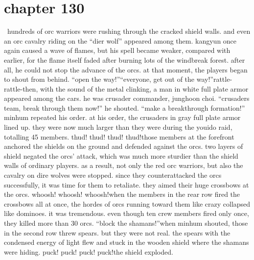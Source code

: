 \section{chapter 130}






 hundreds of orc warriors were rushing through the cracked shield walls.
 and even an orc cavalry riding on the “dier wolf” appeared among them.
kangyun once again caused a wave of flames, but his spell became weaker, compared with earlier, for the flame itself faded after burning lots of the windbreak forest.
after all, he could not stop the advance of the orcs.
at that moment, the players began to shout from behind.
“open the way!”“everyone, get out of the way!”rattle- rattle-then, with the sound of the metal clinking, a man in white full plate armor appeared among the cars.
he was crusader commander, junghoon choi.
“crusaders team, break through them now!” he shouted.
“make a breakthrough formation!” minhum repeated his order.
at his order, the crusaders in gray full plate armor lined up.
 they were now much larger than they were during the youido raid, totalling 45 members.
thud! thud! thud! thud!those members at the forefront anchored the shields on the ground and defended against the orcs.
 two layers of shield negated the orcs’ attack, which was much more sturdier than the shield walls of ordinary players.
as a result, not only the red orc warriors, but also the cavalry on dire wolves were stopped.
 since they counterattacked the orcs successfully, it was time for them to retaliate.
 they aimed their huge crossbows at the orcs.
whoosh! whoosh! whoosh!when the members in the rear row fired the crossbows all at once, the hordes of orcs running toward them like crazy collapsed like dominoes.
 it was tremendous.
 even though ten crew members fired only once, they killed more than 30 orcs.
“block the shamans!”when minhum shouted, those in the second row threw spears.
 but they were not real.
 the spears with the condensed energy of light flew and stuck in the wooden shield where the shamans were hiding.
puck! puck! puck! puck!the shield exploded.

